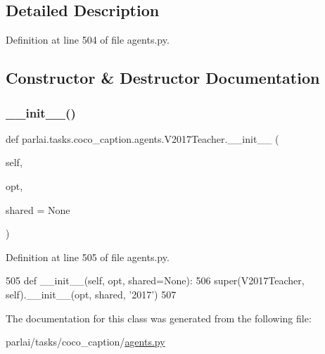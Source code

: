 \subsection{Detailed Description}


Definition at line 504 of file agents.\+py.



\subsection{Constructor \& Destructor Documentation}
\mbox{\label{classparlai_1_1tasks_1_1coco__caption_1_1agents_1_1V2017Teacher_a9e0aff09f69cd575af3238cab3a1d623}} 
\subsubsection{\texorpdfstring{\+\_\+\+\_\+init\+\_\+\+\_\+()}{\_\_init\_\_()}}
{\footnotesize\ttfamily def parlai.\+tasks.\+coco\+\_\+caption.\+agents.\+V2017\+Teacher.\+\_\+\+\_\+init\+\_\+\+\_\+ (\begin{DoxyParamCaption}\item[{}]{self,  }\item[{}]{opt,  }\item[{}]{shared = {\ttfamily None} }\end{DoxyParamCaption})}



Definition at line 505 of file agents.\+py.


\begin{DoxyCode}
505     \textcolor{keyword}{def }\_\_init\_\_(self, opt, shared=None):
506         super(V2017Teacher, self).\_\_init\_\_(opt, shared, \textcolor{stringliteral}{'2017'})
507 \end{DoxyCode}


The documentation for this class was generated from the following file\+:\begin{DoxyCompactItemize}
\item 
parlai/tasks/coco\+\_\+caption/\hyperlink{parlai_2tasks_2coco__caption_2agents_8py}{agents.\+py}\end{DoxyCompactItemize}
